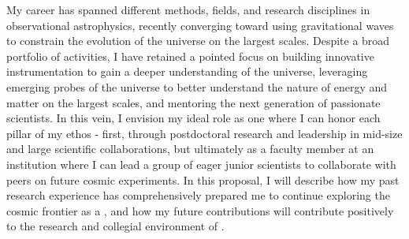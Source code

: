 My career has spanned different methods, fields, and research disciplines in observational astrophysics, recently converging toward using gravitational waves to constrain the evolution of the universe on the largest scales. Despite a broad portfolio of activities, I have retained a pointed focus on building innovative instrumentation to gain a deeper understanding of the universe, leveraging emerging probes of the universe to better understand the nature of energy and matter on the largest scales, and mentoring the next generation of passionate scientists. 
In this vein, I envision my ideal role as one where I can honor each pillar of my ethos - first, through postdoctoral research and leadership in mid-size and large scientific collaborations, but ultimately as a faculty member at an institution where I can lead a group of eager junior scientists to collaborate with peers on future cosmic experiments.
In this proposal, I will describe how my past research experience has comprehensively prepared me to continue exploring the cosmic frontier as a \Position, and how my future contributions will contribute positively to the research and collegial environment of \Institute.